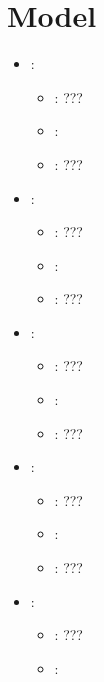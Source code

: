 \section{Model}


\begin{itemize}
    \item {}:
           \begin{itemize}
                \item \optionPossibleValues{}: ???
                \item \optionDefaultValue{}: 
                \item \optionDescrption{}: ???
           \end{itemize}
    \item {}:
           \begin{itemize}
                \item \optionPossibleValues{}: ???
                \item \optionDefaultValue{}: 
                \item \optionDescrption{}: ???
           \end{itemize}
    \item {}:
           \begin{itemize}
                \item \optionPossibleValues{}: ???
                \item \optionDefaultValue{}: 
                \item \optionDescrption{}: ???
           \end{itemize}
    \item {}:
           \begin{itemize}
                \item \optionPossibleValues{}: ???
                \item \optionDefaultValue{}: 
                \item \optionDescrption{}: ???
           \end{itemize}
    \item {}:
           \begin{itemize}
                \item \optionPossibleValues{}: ???
                \item \optionDefaultValue{}: 

\end{itemize}
\end{itemize}
